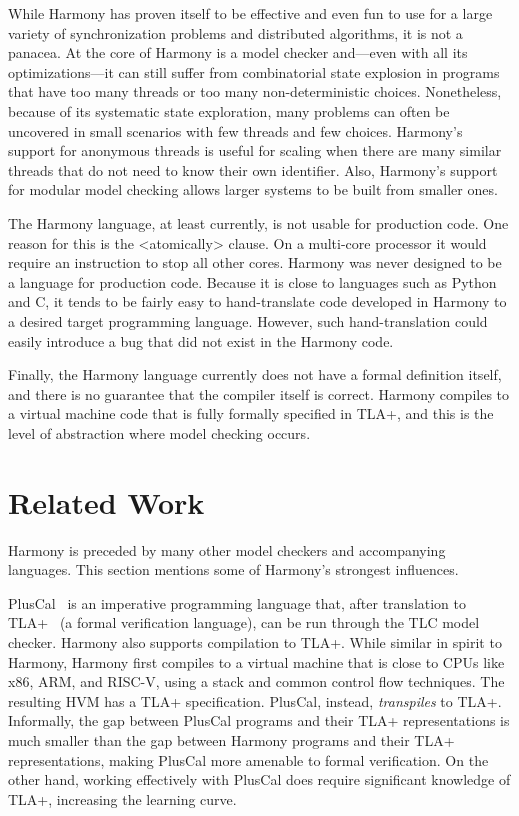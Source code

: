 \documentclass[twocolumn]{article}
\begin{document}
While Harmony has proven itself to be effective and even fun to use
for a large variety of synchronization problems and distributed
algorithms, it is not a panacea.  At the core of Harmony is a model
checker and---even with all its optimizations---it can still suffer
from combinatorial state explosion in programs that have too many
threads or too many non-deterministic choices.  Nonetheless, because
of its systematic state exploration, many problems can often be
uncovered in small scenarios with few threads and few choices.
Harmony's support for anonymous threads is useful for scaling when
there are many similar threads that do not need to know their own
identifier.  Also, Harmony's support for modular model checking
allows larger systems to be built from smaller ones.

The Harmony language, at least currently, is not usable for production
code.  One reason for this is the <{atomically}> clause.  On a multi-core
processor it would require an instruction to stop all other cores.
Harmony was never designed to be a language for production code.  Because
it is close to languages such as Python and C, it tends to be fairly
easy to hand-translate code developed in Harmony to a desired target
programming language.  However, such hand-translation could easily
introduce a bug that did not exist in the Harmony code.

Finally, the Harmony language currently does not have a formal definition
itself, and there is no guarantee that the compiler itself is correct.
Harmony compiles to a virtual machine code that is fully formally
specified in TLA+, and this is the level of abstraction where model
checking occurs.

\section{Related Work}

Harmony is preceded by many other model checkers and accompanying
languages.  This section mentions some of Harmony's strongest influences.

PlusCal~\cite{Lamport09} is an imperative programming language that,
after translation to TLA+~\cite{Lamport02} (a formal verification
language), can be run through the TLC model checker.  Harmony also
supports compilation to TLA+.  While similar in spirit to Harmony,
Harmony first compiles to a virtual machine that is close to CPUs
like x86, ARM, and RISC-V, using a stack and common control flow
techniques.  The resulting HVM has a TLA+ specification.  PlusCal,
instead, \emph{trans\-piles} to TLA+.  Informally, the gap between
PlusCal programs and their TLA+ representations is much smaller
than the gap between Harmony programs and their TLA+ representations,
making PlusCal more amenable to formal verification.  On the other
hand, working effectively with PlusCal does require significant
knowledge of TLA+, increasing the learning curve.
\end{document}
